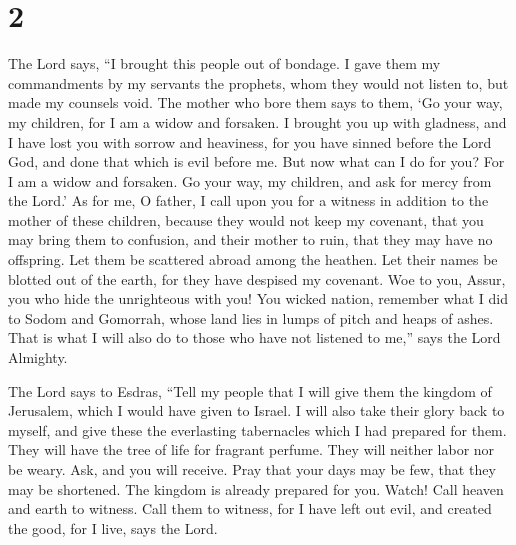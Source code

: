 \hypertarget{section-1}{%
\section{2}\label{section-1}}

 The Lord says, ``I brought this people out of bondage. I
gave them my commandments by my servants the prophets, whom they would
not listen to, but made my counsels void.  The mother who
bore them says to them, `Go your way, my children, for I am a widow and
forsaken.  I brought you up with gladness, and I have lost
you with sorrow and heaviness, for you have sinned before the Lord God,
and done that which is evil before me.  But now what can I
do for you? For I am a widow and forsaken. Go your way, my children, and
ask for mercy from the Lord.'  As for me, O father, I call
upon you for a witness in addition to the mother of these children,
because they would not keep my covenant,  that you may bring
them to confusion, and their mother to ruin, that they may have no
offspring.  Let them be scattered abroad among the heathen.
Let their names be blotted out of the earth, for they have despised my
covenant.  Woe to you, Assur, you who hide the unrighteous
with you! You wicked nation, remember what I did to Sodom and Gomorrah,
 whose land lies in lumps of pitch and heaps of ashes. That
is what I will also do to those who have not listened to me,'' says the
Lord Almighty.

 The Lord says to Esdras, ``Tell my people that I will give
them the kingdom of Jerusalem, which I would have given to Israel.
 I will also take their glory back to myself, and give
these the everlasting tabernacles which I had prepared for them.
 They will have the tree of life for fragrant perfume. They
will neither labor nor be weary.  Ask, and you will
receive. Pray that your days may be few, that they may be shortened. The
kingdom is already prepared for you. Watch!  Call heaven
and earth to witness. Call them to witness, for I have left out evil,
and created the good, for I live, says the Lord.

